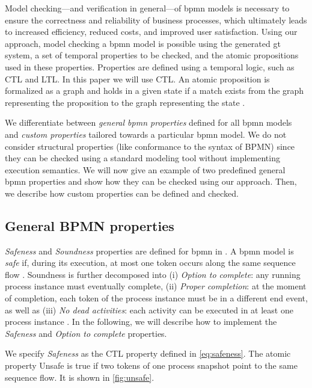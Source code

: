 \documentclass[runningheads]{llncs}
\begin{document}
Model checking---and verification in general---of \gls*{bpmn} models is necessary to ensure the correctness and reliability of business processes, which ultimately leads to increased efficiency, reduced costs, and improved user satisfaction.
Using our approach, model checking a \gls*{bpmn} model is possible using the generated \gls*{gt} system, a set of temporal properties to be checked, and the atomic propositions used in these properties.
Properties are defined using a temporal logic, such as CTL and LTL.
In this paper we will use CTL.
An atomic proposition is formalized as a graph and holds in a given state if a match exists from the graph representing the proposition to the graph representing the state \cite{kastenbergModelCheckingDynamic2006}.

We differentiate between \textit{general \gls*{bpmn} properties} defined for all \gls*{bpmn} models and \textit{custom properties} tailored towards a particular \gls*{bpmn} model.
We do not consider structural properties (like conformance to the syntax of BPMN) since they can be checked using a standard modeling tool without implementing execution semantics.
We will now give an example of two predefined general \gls*{bpmn} properties and show how they can be checked using our approach.
Then, we describe how custom properties can be defined and checked.

\subsection{General BPMN properties}
\textit{Safeness} and \textit{Soundness} properties are defined for \gls*{bpmn} in \cite{corradiniClassificationBPMNCollaborations2018}.
A \gls*{bpmn} model is \textit{safe} if, during its execution, at most one token occurs along the same sequence flow \cite{corradiniClassificationBPMNCollaborations2018}.
Soundness is further decomposed into (i) \textit{Option to complete}: any running process instance must eventually complete, (ii) \textit{Proper completion}: at the moment of completion, each token of the process instance must be in a different end event, as well as (iii) \textit{No dead activities}: each activity can be executed in at least one process instance \cite{corradiniClassificationBPMNCollaborations2018}.
In the following, we will describe how to implement the \textit{Safeness} and \textit{Option to complete} properties.

We specify \textit{Safeness} as the CTL property defined in \eqref{eq:safeness}.
The atomic property \textsf{Unsafe} is true if two tokens of one process snapshot point to the same sequence flow.
It is shown in \autoref{fig:unsafe}.
\end{document}
